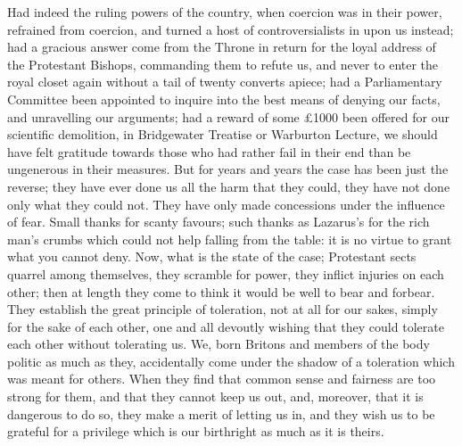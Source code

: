 Had indeed the ruling powers of the country, when
coercion was in their power, refrained from coercion, and
turned a host of controversialists in upon us instead;
had a gracious answer come from the Throne in return for
the loyal address of the Protestant Bishops, commanding
them to refute us, and never to enter the royal closet
again without a tail of twenty converts apiece; had a
Parliamentary Committee been appointed to inquire into
the best means of denying our facts, and unravelling our
arguments; had a reward of some £1000 been offered for
our scientific demolition, in Bridgewater Treatise or
Warburton Lecture, we should have felt gratitude towards
those who had rather fail in their end than be ungenerous
in their measures. But for years and years the case has
been just the reverse; they have ever done us all the
harm that they could, they have not done only what they
could not. They have only made concessions under the
influence of fear. Small thanks for scanty favours; such
thanks as Lazarus's for the rich man's crumbs which could
not help falling from the table: it is no virtue to grant
what you cannot deny. Now, what is the state of the case;
Protestant sects quarrel among themselves, they scramble
for power, they inflict injuries on each other; then at
length they come to think it would be well to bear and
forbear. They establish the great principle of
toleration, not at all for our sakes, simply for the sake
of each other, one and all devoutly wishing that they
could tolerate each other without tolerating us. We, born
Britons and members of the body politic as much as they,
accidentally come under the shadow of a toleration which
was meant for others. When they find that common sense
and fairness are too strong for them, and that they
cannot keep us out, and, moreover, that it is dangerous
to do so, they make a merit of letting us in, and they wish us to be grateful for a privilege which is our
birthright as much as it is theirs.

